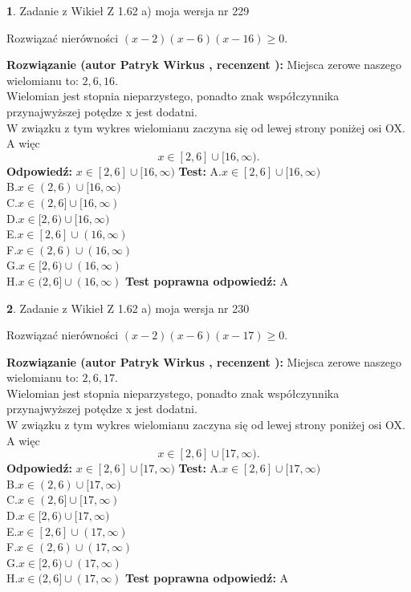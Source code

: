 \documentclass[12pt, a4paper]{article}
\theoremstyle{definition} %
\newtheorem{zad}{}
\newcommand{\zadStart}[1]{\begin{zad}#1\newline}
\newcommand{\zadStop}{\end{zad}}
\newcommand{\rozwStart}[2]{\noindent \textbf{Rozwiązanie (autor #1 , recenzent #2): }\newline}
\newcommand{\rozwStop}{\newline}
\newcommand{\odpStart}{\noindent \textbf{Odpowiedź:}\newline}
\newcommand{\odpStop}{\newline}
\newcommand{\testStart}{\noindent \textbf{Test:}\newline}
\newcommand{\testStop}{\newline}
\newcommand{\kluczStart}{\noindent \textbf{Test poprawna odpowiedź:}\newline}
\newcommand{\kluczStop}{\newline}
\begin{document}
\zadStart{Zadanie z Wikieł Z 1.62 a) moja wersja nr 229}

Rozwiązać nierówności $(x-2)(x-6)(x-16)\ge0$.
\zadStop
\rozwStart{Patryk Wirkus}{}
Miejsca zerowe naszego wielomianu to: $2, 6, 16$.\\
Wielomian jest stopnia nieparzystego, ponadto znak współczynnika przy\linebreak najwyższej potędze x jest dodatni.\\ W związku z tym wykres wielomianu zaczyna się od lewej strony poniżej osi OX. A więc $$x \in [2,6] \cup [16,\infty).$$
\rozwStop
\odpStart
$x \in [2,6] \cup [16,\infty)$
\odpStop
\testStart
A.$x \in [2,6] \cup [16,\infty)$\\
B.$x \in (2,6) \cup [16,\infty)$\\
C.$x \in (2,6] \cup [16,\infty)$\\
D.$x \in [2,6) \cup [16,\infty)$\\
E.$x \in [2,6] \cup (16,\infty)$\\
F.$x \in (2,6) \cup (16,\infty)$\\
G.$x \in [2,6) \cup (16,\infty)$\\
H.$x \in (2,6] \cup (16,\infty)$
\testStop
\kluczStart
A
\kluczStop



\zadStart{Zadanie z Wikieł Z 1.62 a) moja wersja nr 230}

Rozwiązać nierówności $(x-2)(x-6)(x-17)\ge0$.
\zadStop
\rozwStart{Patryk Wirkus}{}
Miejsca zerowe naszego wielomianu to: $2, 6, 17$.\\
Wielomian jest stopnia nieparzystego, ponadto znak współczynnika przy\linebreak najwyższej potędze x jest dodatni.\\ W związku z tym wykres wielomianu zaczyna się od lewej strony poniżej osi OX. A więc $$x \in [2,6] \cup [17,\infty).$$
\rozwStop
\odpStart
$x \in [2,6] \cup [17,\infty)$
\odpStop
\testStart
A.$x \in [2,6] \cup [17,\infty)$\\
B.$x \in (2,6) \cup [17,\infty)$\\
C.$x \in (2,6] \cup [17,\infty)$\\
D.$x \in [2,6) \cup [17,\infty)$\\
E.$x \in [2,6] \cup (17,\infty)$\\
F.$x \in (2,6) \cup (17,\infty)$\\
G.$x \in [2,6) \cup (17,\infty)$\\
H.$x \in (2,6] \cup (17,\infty)$
\testStop
\kluczStart
A
\kluczStop
\end{document}
